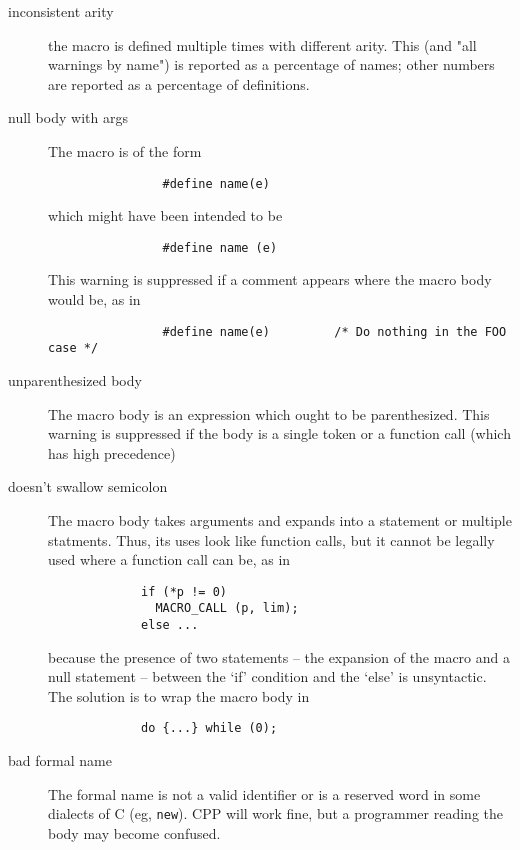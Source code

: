 
\begin{description}
\item[inconsistent arity]
        the macro is defined multiple times with different arity.
        This (and "all warnings by name") is reported as a percentage of
        names; other numbers are reported as a percentage of definitions.

\item[null body with args]
        The macro is of the form
\begin{verbatim}
                #define name(e)
\end{verbatim}
        which might have been intended to be
\begin{verbatim}
                #define name (e)
\end{verbatim}
        This warning is suppressed if a comment appears where the macro
        body would be, as in
\begin{verbatim}
                #define name(e)         /* Do nothing in the FOO case */
\end{verbatim}

\item[unparenthesized body]
        The macro body is an expression which ought to be parenthesized.
        This warning is suppressed if the body is a single token or a
        function call (which has high precedence)

\item[doesn't swallow semicolon]
        The macro body takes arguments and expands into a statement or
        multiple statments.  Thus, its uses look like function calls, but
        it cannot be legally used where a function call can be, as in
\begin{verbatim}
             if (*p != 0)
               MACRO_CALL (p, lim);
             else ...
\end{verbatim}
        because the presence of two statements -- the expansion of the macro and
        a null statement -- between the `if' condition and the `else'
        is unsyntactic.  The solution is to wrap the macro body in
\begin{verbatim}
             do {...} while (0);
\end{verbatim}

\item[bad formal name]
        The formal name is not a valid identifier or is a reserved word in
        some dialects of C (eg, {\tt new}).  CPP will work fine, but a
        programmer reading the body may become confused.


\end{description}
